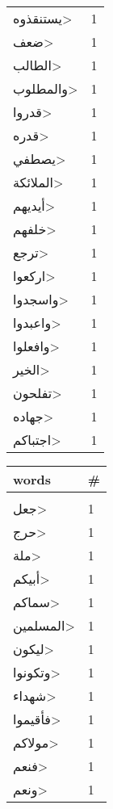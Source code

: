 \documentclass{article}
\begin{document}
\begin{multicols}{6}
\begin{center}
\begin{tabular}{ P{2cm}  P{1cm}}
\<يستنقذوه> & 1 \\ 
\<ضعف> & 1 \\ 
\<الطالب> & 1 \\ 
\<والمطلوب> & 1 \\ 
\<قدروا> & 1 \\ 
\<قدره> & 1 \\ 
\<يصطفي> & 1 \\ 
\<الملائكة> & 1 \\ 
\<أيديهم> & 1 \\ 
\<خلفهم> & 1 \\ 
\<ترجع> & 1 \\ 
\<اركعوا> & 1 \\ 
\<واسجدوا> & 1 \\ 
\<واعبدوا> & 1 \\ 
\<وافعلوا> & 1 \\ 
\<الخير> & 1 \\ 
\<تفلحون> & 1 \\ 
\<جهاده> & 1 \\ 
\<اجتباكم> & 1 \\ 
\end{tabular} 
\begin{tabular}{ P{2cm}  P{1cm}} 
\textbf{words}    & \textbf{\#}  \\
\hline
\\[0.01cm] 
\<جعل> & 1 \\ 
\<حرج> & 1 \\ 
\<ملة> & 1 \\ 
\<أبيكم> & 1 \\ 
\<سماكم> & 1 \\ 
\<المسلمين> & 1 \\ 
\<ليكون> & 1 \\ 
\<وتكونوا> & 1 \\ 
\<شهداء> & 1 \\ 
\<فأقيموا> & 1 \\ 
\<مولاكم> & 1 \\ 
\<فنعم> & 1 \\ 
\<ونعم> & 1 \\ 
\end{tabular} 
\end{center}
\end{multicols}
\end{document}
